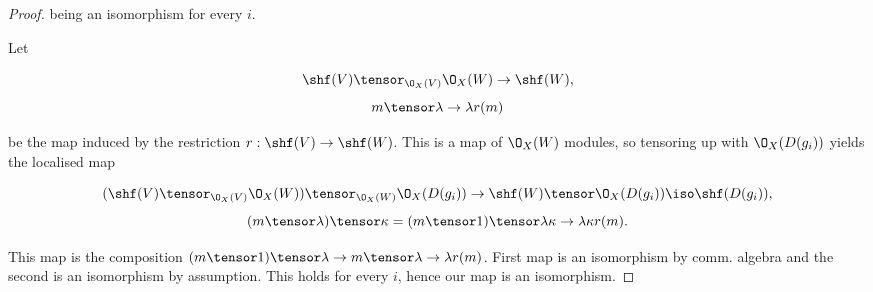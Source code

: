 \begin{proof}
being an isomorphism for every $i$.

Let 

\[\shf(V)\tensor_{\O_X(V)} \O_X(W) \rightarrow \shf(W),\]
\[m \tensor \lambda \to \lambda r(m)\]

be the map induced by the restriction $r:\shf(V) \rightarrow \shf(W)$.
This is a map of $\O_X(W)$ modules, so tensoring up with $\O_X(D(g_i))$ yields the localised map

\[(\shf(V)\tensor_{\O_X(V)}  \O_X(W)) \tensor_{\O_X(W)} \O_X(D(g_i)) \rightarrow \shf(W) \tensor \O_X(D(g_i)) \iso \shf(D(g_i)),\]
\[(m \tensor \lambda)\tensor \kappa = (m\tensor 1) \tensor \lambda \kappa \to \lambda \kappa r(m).\]

This map is the composition  $(m\tensor 1) \tensor \lambda \rightarrow m\tensor \lambda \rightarrow \lambda r(m)$.
First map is an isomorphism by comm. algebra and the second is an isomorphism by assumption.
This holds for every $i$, hence our map is an isomorphism.
\end{proof}
